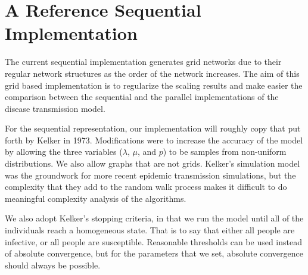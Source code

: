 \section{A Reference Sequential Implementation}\label{sec:sequential-implementation-\myInitials}

The current sequential implementation generates grid networks due to their regular network structures as the order of the network increases. The aim of this grid based implementation is to regularize the scaling results and make easier the comparison between the sequential and the parallel implementations of the disease transmission model.

For the sequential representation, our implementation will roughly copy that put forth by Kelker in 1973\cite{Kelker1973}. Modifications were to increase the accuracy of the model by allowing the three variables ($\lambda$, $\mu$, and $p$) to be samples from non-uniform distributions. We also allow graphs that are not grids. Kelker's simulation model was the groundwork for more recent epidemic transmission simulations, but the complexity that they add to the random walk process makes it difficult to do meaningful complexity analysis of the algorithms. 

We also adopt Kelker's stopping criteria, in that we run the model until all of the individuals reach a homogeneous state. That is to say that either all people are infective, or all people are susceptible. Reasonable thresholds can be used instead of absolute convergence, but for the parameters that we set, absolute convergence should always be possible. 
